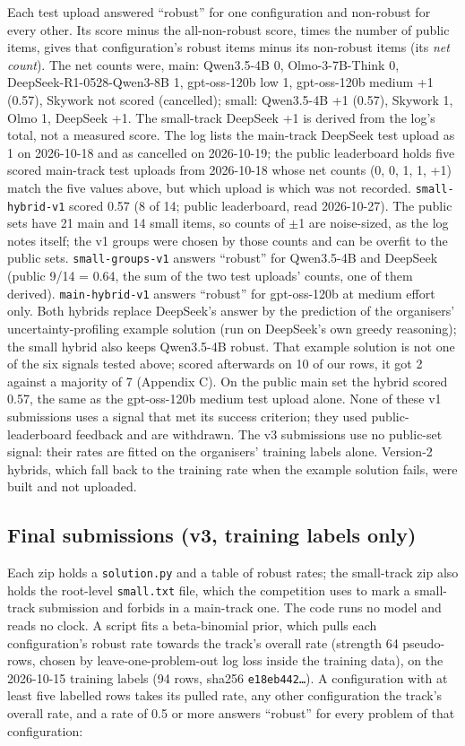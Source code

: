 \documentclass{article}
\begin{document}
Each test upload answered ``robust'' for one configuration and non-robust for every other. Its score minus the all-non-robust score, times the number of public items, gives that configuration's robust items minus its non-robust items (its \emph{net count}). The net counts were,
main: Qwen3.5-4B 0, Olmo-3-7B-Think 0, DeepSeek-R1-0528-Qwen3-8B \textminus{}1, gpt-oss-120b low \textminus{}1,
gpt-oss-120b medium +1 (0.57), Skywork not scored (cancelled); small: Qwen3.5-4B +1 (0.57), Skywork \textminus{}1,
Olmo \textminus{}1, DeepSeek +1. The small-track DeepSeek +1 is derived from the log's total, not a measured
score. The log lists the main-track DeepSeek test upload as \textminus{}1 on 2026-10-18 and as cancelled on 2026-10-19;
the public leaderboard holds five scored main-track test uploads from 2026-10-18 whose net counts (0, 0, \textminus{}1, \textminus{}1, +1)
match the five values above, but which upload is which was not recorded. \texttt{small-hybrid-v1} scored
0.57 (8 of 14; public leaderboard, read 2026-10-27). The public sets have 21 main and 14 small items, so counts of $\pm$1 are
noise-sized, as the log notes itself; the v1 groups were chosen by those counts and can be
overfit to the public sets. \texttt{small-groups-v1} answers ``robust'' for Qwen3.5-4B and DeepSeek
(public 9/14 = 0.64, the sum of the two test uploads' counts, one of them derived). \texttt{main-hybrid-v1} answers ``robust'' for
gpt-oss-120b at medium effort only. Both hybrids replace DeepSeek's answer by the prediction of the
organisers' uncertainty-profiling example solution (run on DeepSeek's own
greedy reasoning); the small hybrid also keeps Qwen3.5-4B robust. That example solution is not one of the six
signals tested above; scored afterwards on 10 of our rows, it got 2 against a majority of 7 (Appendix C). On the public main set the hybrid scored
0.57, the same as the gpt-oss-120b medium test upload alone. None of these v1 submissions uses a signal that
met its success criterion; they used public-leaderboard feedback and are withdrawn. The v3 submissions use no public-set signal: their rates are fitted on the organisers' training labels alone. Version-2 hybrids, which fall back to the training rate when the example solution fails,
were built and not uploaded.

\subsection*{Final submissions (v3, training labels only)}

Each zip holds a \texttt{solution.py} and a table of robust rates; the small-track zip also holds the root-level
\texttt{small.txt} file, which the competition uses to mark a small-track submission and forbids in a main-track one. The code runs no model and reads no clock. A script fits a beta-binomial prior, which pulls each configuration's robust rate towards the track's overall rate
(strength 64 pseudo-rows, chosen by leave-one-problem-out log loss inside the training data), on the 2026-10-15
training labels (94 rows, sha256 \texttt{e18eb442\ldots{}}). A configuration with
at least five labelled rows takes its pulled rate, any other configuration the track's overall
rate, and a rate of 0.5 or more answers ``robust'' for every problem of that configuration:
\end{document}
